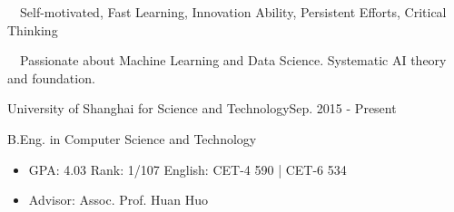 \documentclass{sorahjy_cv}
\begin{document}
\pagestyle{empty}


\begin{cvHeader}
\end{cvHeader}

%
%

\begin{description}{}
	\item{\ \ }Self-motivated, Fast Learning, Innovation Ability, Persistent Efforts, Critical Thinking %
	\item{\ \ }Passionate about Machine Learning and Data Science. Systematic AI theory and foundation.
\end{description}



%
%

\begin{sectionContentSimple}{University of Shanghai for Science and Technology}{Sep. 2015 - Present}
	\item B.Eng. in Computer Science and Technology
	\begin{itemize}
		\item GPA: 4.03 \quad Rank: 1/107 \quad \quad English: CET-4 590 | CET-6 534
		\item Advisor: Assoc. Prof. Huan Huo
	\end{itemize}
	
\end{sectionContentSimple}

%
%



\end{document}
